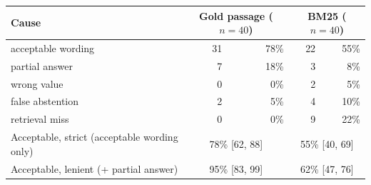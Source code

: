 \begin{tabular}{lrrrr}
\toprule
Cause & \multicolumn{2}{c}{Gold passage ($n=40$)} & \multicolumn{2}{c}{BM25 ($n=40$)} \\
\midrule
acceptable wording & 31 & 78\% & 22 & 55\% \\
partial answer & 7 & 18\% & 3 & 8\% \\
wrong value & 0 & 0\% & 2 & 5\% \\
false abstention & 2 & 5\% & 4 & 10\% \\
retrieval miss & 0 & 0\% & 9 & 22\% \\
\midrule
Acceptable, strict (acceptable wording only) & \multicolumn{2}{c}{78\% [62, 88]} & \multicolumn{2}{c}{55\% [40, 69]} \\
Acceptable, lenient (+ partial answer) & \multicolumn{2}{c}{95\% [83, 99]} & \multicolumn{2}{c}{62\% [47, 76]} \\
\bottomrule
\end{tabular}
